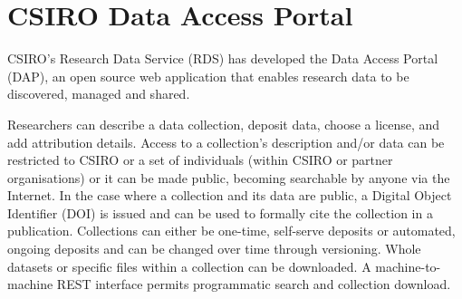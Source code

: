 \documentclass{llncs}
\begin{document}



\section{CSIRO Data Access Portal}
CSIRO's Research Data Service (RDS) has developed the Data Access Portal (DAP),
an open source web application that enables research data to be discovered,
managed and shared. \cite{DAP}

Researchers can describe a data collection, deposit data, choose a license, and
add attribution details. Access to a collection’s description and/or data can be
restricted to CSIRO or a set of individuals (within CSIRO or partner
organisations) or it can be made public, becoming searchable by anyone via the
Internet. In the case where a collection and its data are public, a Digital
Object Identifier (DOI) is issued and can be used to formally cite the
collection in a publication. Collections can either be one-time, self-serve
deposits or automated, ongoing deposits and can be changed over time through
versioning. Whole datasets or specific files within a collection can be
downloaded. A machine-to-machine REST interface permits programmatic search and
collection download.
\end{document}
